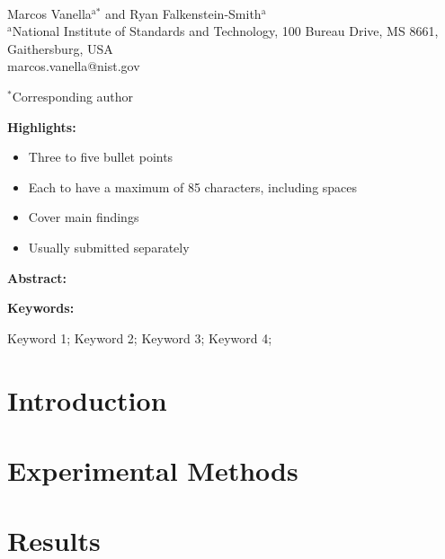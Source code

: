 \documentclass[12pt,letterpaper]{article}
\begin{document}
\begin{flushleft} %

\textbf{}
\vspace{3mm}\\
%
Marcos Vanella$^\text{a*}$ and Ryan Falkenstein-Smith$^\text{a}$
\vspace{3mm}\\	

$^\text{a}$National Institute of Standards and Technology, 100 Bureau Drive, MS 8661, Gaithersburg, USA  \\
marcos.vanella@nist.gov
\vspace{3mm}

$^*$Corresponding author

\textbf{Highlights:}	
\begin{itemize}
	\itemsep-4pt %
	\item Three to five bullet points
	\item Each to have a maximum of 85 characters, including spaces
	\item Cover main findings
	\item Usually submitted separately
\end{itemize}
\vspace{3mm}

\textbf{Abstract:}
\vspace{3mm}


\textbf{Keywords:}

Keyword 1; Keyword 2; Keyword 3; Keyword 4; 

\section{Introduction}

\section{Experimental Methods}

\section{Results}


\end{flushleft}
\end{document}
